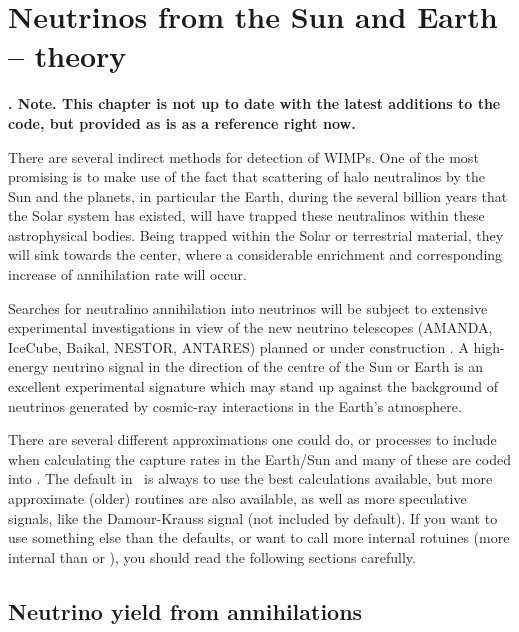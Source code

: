 \section{Neutrinos from the Sun and Earth --  theory}


{\bfseries. Note. This chapter is not up to date with the latest additions to the code, but provided as is as a reference right now.}

There are several indirect methods for detection of WIMPs.
One of the most promising \cite{Krauss:1985unpub,Press:1985ug,Silk:1985ax,Krauss:1985ks,Krauss:1985aaa,Gaisser:1986ha,Griest:1986yu,Hagelin:1986gv,Freese:1985qw,Kamionkowski:1991nj,Halzen:1991kh,Bottino:1991dy,Bottino:1994xp,Gandhi:1993ce,Bergstrom:1996kp,Bergstrom:1998xh} is to make use of the
fact that scattering of halo neutralinos by the Sun and the planets,
in particular the Earth, during the several
billion years that the Solar system has existed, will have trapped
these neutralinos within these astrophysical bodies. Being trapped
within the Solar or terrestrial material, they will sink towards
the center, where a considerable enrichment and corresponding
increase of annihilation rate will occur.


Searches for neutralino annihilation into neutrinos
will be subject to  extensive experimental investigations in view
of the new neutrino telescopes (AMANDA, IceCube, Baikal, NESTOR, ANTARES)
planned or under construction \cite{Halzen:1996su}. A high-energy
neutrino signal in the direction of the centre of the Sun or Earth
is an excellent experimental signature which may stand up against
the background of neutrinos generated by cosmic-ray interactions in the
Earth's atmosphere.

There are several different approximations one could do, or processes to
include when calculating the capture rates in the Earth/Sun and many of these
are coded into \ds. The default in \ds\ is always to use the best calculations
available, but more approximate (older) routines are also available,
as well as more speculative signals, like the Damour-Krauss signal
(not included by default). If you want to use something else than the
defaults, or want to call more internal rotuines (more internal than
 or ), you should read the
following sections carefully.


\subsection{Neutrino yield from annihilations}

